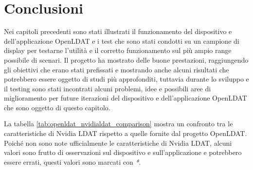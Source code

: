 \chapter{Conclusioni}
\label{chap:outro}

Nei capitoli precedenti sono stati illustrati il funzionamento del dispositivo e dell'applicazione OpenLDAT e i test che sono stati condotti su un campione di display per testarne l'utilità e il corretto funzionamento sul più ampio range possibile di scenari. Il progetto ha mostrato delle buone prestazioni, raggiungendo gli obiettivi che erano stati prefissati e mostrando anche alcuni risultati che potrebbero essere oggetto di studi più approfonditi, tuttavia durante lo sviluppo e il testing sono stati incontrati alcuni problemi, idee e possibili aree di miglioramento per future iterazioni del dispositivo e dell'applicazione OpenLDAT che sono oggetto di questo capitolo.

La tabella \ref{tab:openldat_nvidialdat_comparison} mostra un confronto tra le caratteristiche di Nvidia LDAT rispetto a quelle fornite dal progetto OpenLDAT. Poiché non sono note ufficialmente le caratteristiche di Nvidia LDAT, alcuni valori sono frutto di osservazioni sul dispositivo e sull'applicazione e potrebbero essere errati, questi valori sono marcati con \textit{*}.

